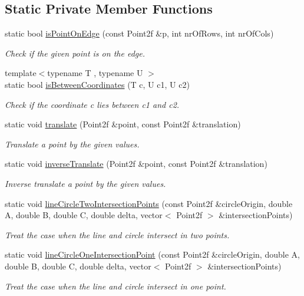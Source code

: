 \subsection*{\-Static \-Private \-Member \-Functions}
\begin{DoxyCompactItemize}
\item 
static bool \hyperlink{classmultiscale_1_1Geometry2D_a4a6aba3c69956a83af5d81f4d087c205}{is\-Point\-On\-Edge} (const \-Point2f \&p, int nr\-Of\-Rows, int nr\-Of\-Cols)
\begin{DoxyCompactList}\small\item\em \-Check if the given point is on the edge. \end{DoxyCompactList}\item 
{\footnotesize template$<$typename T , typename U $>$ }\\static bool \hyperlink{classmultiscale_1_1Geometry2D_af8cb580f5f86a1fece582f43a0916c4a}{is\-Between\-Coordinates} (\-T c, \-U c1, \-U c2)
\begin{DoxyCompactList}\small\item\em \-Check if the coordinate c lies between c1 and c2. \end{DoxyCompactList}\item 
static void \hyperlink{classmultiscale_1_1Geometry2D_ae7299287a17f8cd47e8d84e19ddbe0e9}{translate} (\-Point2f \&point, const \-Point2f \&translation)
\begin{DoxyCompactList}\small\item\em \-Translate a point by the given values. \end{DoxyCompactList}\item 
static void \hyperlink{classmultiscale_1_1Geometry2D_a7a7526398a9675a05c609bb442fe02f0}{inverse\-Translate} (\-Point2f \&point, const \-Point2f \&translation)
\begin{DoxyCompactList}\small\item\em \-Inverse translate a point by the given values. \end{DoxyCompactList}\item 
static void \hyperlink{classmultiscale_1_1Geometry2D_ae501398552bf50acfd23c04db8d65300}{line\-Circle\-Two\-Intersection\-Points} (const \-Point2f \&circle\-Origin, double \-A, double \-B, double \-C, double delta, vector$<$ \-Point2f $>$ \&intersection\-Points)
\begin{DoxyCompactList}\small\item\em \-Treat the case when the line and circle intersect in two points. \end{DoxyCompactList}\item 
static void \hyperlink{classmultiscale_1_1Geometry2D_ad9a4555568f44ef912601d669ef94e03}{line\-Circle\-One\-Intersection\-Point} (const \-Point2f \&circle\-Origin, double \-A, double \-B, double \-C, double delta, vector$<$ \-Point2f $>$ \&intersection\-Points)
\begin{DoxyCompactList}\small\item\em \-Treat the case when the line and circle intersect in one point. \end{DoxyCompactList}\end{DoxyCompactItemize}


